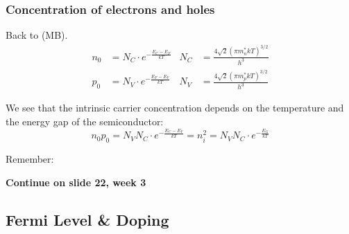 \documentclass[a4paper, fontsize=8pt, landscape, DIV=1]{scrartcl}
\begin{document}
\begin{multicols*}{4}
  \subsubsection{Concentration of electrons and holes}
  Back to (MB).
  \begin{align*}
    n_0 &= N_C \cdot e^{-\frac{E_C-E_F}{kT}} & N_C &= \frac{4\sqrt{2}(\pi m^*_n kT)^{3/2}}{h^3} \\
    p_0 &= N_V \cdot e^{-\frac{E_F-E_V}{kT}} & N_V &= \frac{4\sqrt{2}(\pi m^*_p kT)^{3/2}}{h^3} 
  \end{align*}

  We see that the intrinsic carrier concentration depends on the temperature and the energy gap of the semiconductor:
  \[n_0 p_0 = N_V N_C \cdot e^{-\frac{E_C-E_V}{kT}} = n_i^2 = N_VN_C\cdot e^{-\frac{E_G}{kT}}\]

  Remember:

  \textbf{Continue on slide 22, week 3}

  \subsection{Fermi Level \& Doping}
  \subsection{}
  \subsection{}
\end{multicols*}

\setcounter{secnumdepth}{2}
\end{document}
